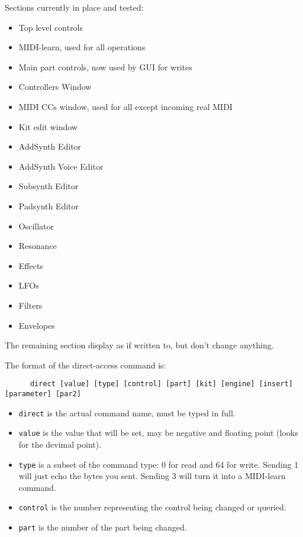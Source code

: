    Sections currently in place and tested:

   \begin{itemize}
      \item Top level controls
      \item MIDI-learn, used for all operations
      \item Main part controls, now used by GUI for writes
      \item Controllers Window
      \item MIDI CCs window, used for all except incoming real MIDI
      \item Kit edit window
      \item AddSynth Editor
      \item AddSynth Voice Editor
      \item Subsynth Editor
      \item Padsynth Editor
      \item Oscillator
      \item Resonance
      \item Effects
      \item LFOs
      \item Filters
      \item Envelopes
   \end{itemize}

   The remaining section display as if written to, but don't
   change anything.

%
%

   The format of the direct-access command is:

   \begin{verbatim}
      direct [value] [type] [control] [part] [kit] [engine] [insert] [parameter] [par2]
   \end{verbatim}

   \begin{itemize}
      \item \texttt{direct} is the actual command name, must be typed in full.
      \item \texttt{value} is the value that will be set, may be negative and
         floating point (looks for the devimal point).
      \item \texttt{type} is a subset of the command type: 0 for read and 64 for
         write. Sending 1 will just echo the bytes you sent.  Sending 3 will
         turn it into a MIDI-learn command.
      \item \texttt{control} is the number representing the control being
         changed or queried.
      \item \texttt{part} is the number of the part being changed.
   \end{itemize}

